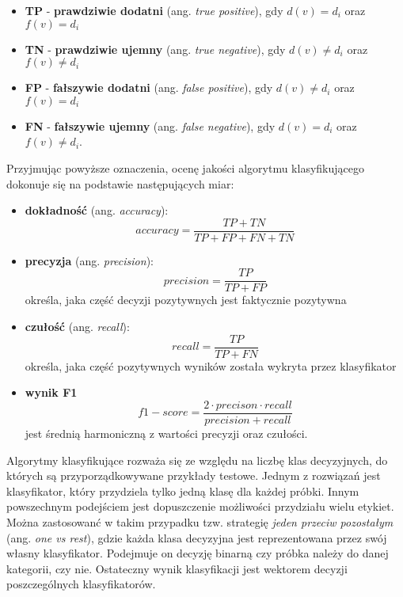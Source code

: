 \documentclass{pracamgr}
\begin{document}
\begin{itemize}
    \item \textbf{TP} - \textbf{prawdziwie dodatni} (ang. \textit{true positive}), gdy $d(v) = d_i$ oraz $f(v) = d_i$
    \item \textbf{TN} - \textbf{prawdziwie ujemny} (ang. \textit{true negative}), gdy $d(v) \neq d_i$ oraz $f(v) \neq d_i$
    \item \textbf{FP} - \textbf{fałszywie dodatni} (ang. \textit{false positive}), gdy $d(v) \neq d_i$ oraz $f(v) = d_i$
    \item \textbf{FN} - \textbf{fałszywie ujemny} (ang. \textit{false negative}), gdy $d(v) = d_i$ oraz $f(v) \neq d_i$.
\end{itemize}

Przyjmując powyższe oznaczenia, ocenę jakości algorytmu klasyfikującego dokonuje się na podstawie następujących miar:

\begin{itemize}
    \item \textbf{dokładność} (ang. \textit{accuracy}):
        \[
            accuracy = \frac{TP + TN}{TP + FP + FN + TN}
        \]
    \item \textbf{precyzja} (ang. \textit{precision}):
        \[
            precision = \frac{TP}{TP + FP}
        \]
        określa, jaka część decyzji pozytywnych jest faktycznie pozytywna 
    \item \textbf{czułość} (ang. \textit{recall}):
        \[
            recall = \frac{TP}{TP + FN}
        \]
        określa, jaka część pozytywnych wyników została wykryta przez klasyfikator
    \item \textbf{wynik F1}
        \[
            f1-score = \frac{2 \cdot precison \cdot recall}{precision + recall} 
        \]
        jest średnią harmoniczną z wartości precyzji oraz czułości.
\end{itemize}

Algorytmy klasyfikujące rozważa się ze względu na liczbę klas decyzyjnych, do których są przyporządkowywane przykłady testowe. Jednym z rozwiązań jest klasyfikator, który przydziela tylko jedną klasę dla każdej próbki. Innym powszechnym podejściem jest dopuszczenie możliwości przydziału wielu etykiet. Można zastosowanć w takim przypadku tzw. strategię \textit{jeden przeciw pozostałym} (ang. \textit{one vs rest}), gdzie każda klasa decyzyjna jest reprezentowana przez swój własny klasyfikator. Podejmuje on decyzję binarną czy próbka należy do danej kategorii, czy nie. Ostateczny wynik klasyfikacji jest wektorem decyzji poszczególnych klasyfikatorów.
\end{document}
